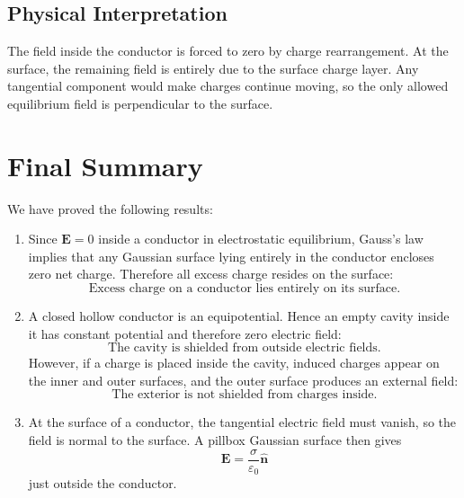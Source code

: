 \documentclass[hidelinks]{article}
\begin{document}
\subsection{Physical Interpretation}

The field inside the conductor is forced to zero by charge rearrangement. At the surface, the remaining field is entirely due to the surface charge layer. Any tangential component would make charges continue moving, so the only allowed equilibrium field is perpendicular to the surface.

\section{Final Summary}

We have proved the following results:

\begin{enumerate}[label=\textbf{(\alph*)}]
    \item Since $\mathbf{E}=0$ inside a conductor in electrostatic equilibrium, Gauss's law implies that any Gaussian surface lying entirely in the conductor encloses zero net charge. Therefore all excess charge resides on the surface:
    \[
    \boxed{\text{Excess charge on a conductor lies entirely on its surface.}}
    \]

    \item A closed hollow conductor is an equipotential. Hence an empty cavity inside it has constant potential and therefore zero electric field:
    \[
    \boxed{\text{The cavity is shielded from outside electric fields.}}
    \]
    However, if a charge is placed inside the cavity, induced charges appear on the inner and outer surfaces, and the outer surface produces an external field:
    \[
    \boxed{\text{The exterior is not shielded from charges inside.}}
    \]

    \item At the surface of a conductor, the tangential electric field must vanish, so the field is normal to the surface. A pillbox Gaussian surface then gives
    \[
    \boxed{\mathbf{E}=\frac{\sigma}{\varepsilon_0}\hat{\mathbf{n}}}
    \]
    just outside the conductor.
\end{enumerate}
\end{document}
